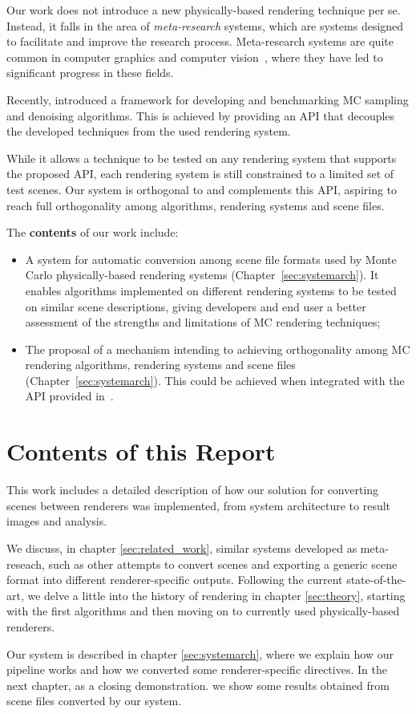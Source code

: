 Our work does not introduce a new physically-based rendering technique per se. Instead, it falls in the area of {\it meta-research} systems, which are systems 
designed to facilitate and improve the research process. Meta-research systems are quite common in computer graphics and computer vision~\cite{MiddleburyStereo, MiddleburyFlow, AlphaMatting, VideoMatting}, where they have led to significant progress in these fields. 
  
Recently, \cite{Santos:2018:FBKSD} introduced a framework for developing and benchmarking MC sampling and denoising algorithms. This is achieved by providing an API that decouples the developed techniques from the used rendering system. 

While it allows a technique to be tested on any rendering system that supports the proposed API, each rendering system is still constrained to a limited set of test scenes. Our system is orthogonal to and complements this API, aspiring to reach full orthogonality among algorithms, rendering systems and scene files.

The {\bf contents} of our work include:
\begin{itemize}
	\item A system for automatic conversion among scene file formats used by Monte Carlo physically-based rendering systems (Chapter~\ref{sec:systemarch}).
	It enables algorithms implemented on different rendering systems to be tested on similar scene descriptions, giving developers and end user a better 
assessment of the strengths and limitations of MC rendering techniques;
	\item The proposal of a mechanism intending to achieving orthogonality among MC rendering algorithms, rendering systems and scene files (Chapter~\ref{sec:systemarch}). 
This could be achieved when integrated with the API provided in~\cite{Santos:2018:FBKSD}. 
\end{itemize}

\section{Contents of this Report}

This work includes a detailed description of how our solution for converting scenes between renderers was implemented, from system architecture to result 
images and analysis.

We discuss, in chapter \ref{sec:related_work}, similar systems developed as meta-reseach, such as other attempts to convert scenes and exporting a generic 
scene format into different renderer-specific outputs. Following the current state-of-the-art, we delve a little into the history of rendering in chapter \ref{sec:theory}, starting with the first algorithms and then moving on to currently used physically-based renderers.

Our system is described in chapter \ref{sec:systemarch}, where we explain how our pipeline works and how we converted some renderer-specific directives. In the next chapter, as a closing demonstration. we show some results obtained from scene files converted by our system.


